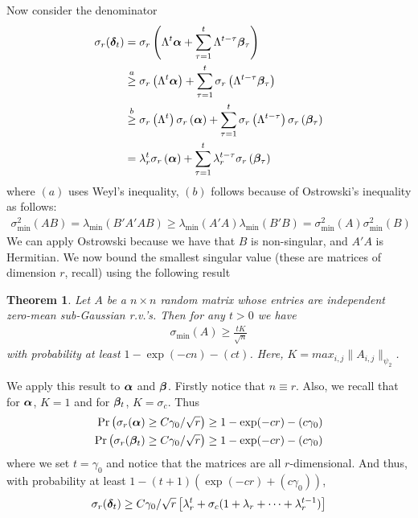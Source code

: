 \documentclass[10pt]{article}
\newtheorem{theorem}{Theorem}
\begin{document}
Now consider the denominator
\begin{align*}
\sigma_r(\bm{\delta}_t) &= \sigma_r\left(\Lambda^t \bm{\alpha} + \sum_{\tau=1}^t \Lambda^{t-\tau} \bm{\beta}_\tau\right) \\
&\overset{a}{\geq}  \sigma_r\left(\Lambda^t \bm{\alpha}\right) + \sum_{\tau=1}^t \sigma_r\left(\Lambda^{t-\tau} \bm{\beta}_\tau\right) \\
&\overset{b}{\geq}  \sigma_r\left(\Lambda^t \right) \sigma_r \left( \bm{\alpha}\right) + \sum_{\tau=1}^t \sigma_r\left(\Lambda^{t-\tau}\right) \sigma_r\left(\bm{\beta}_\tau\right) \\
&= \lambda_r^t \sigma_r\left( \bm{\alpha}\right) + \sum_{\tau=1}^t \lambda_{r}^{t-\tau} \sigma_r\left(\bm{\beta}_\tau\right) 
\end{align*}
where $(a)$ uses Weyl's inequality, $(b)$ follows because of Ostrowski's inequality as follows: 
\begin{align*}
\sigma_{\min}^2(AB) = \lambda_{\min}(B'A'A B) \geq \lambda_{\min}(A'A) \lambda_{\min}(B'B) = \sigma_{\min}^2(A) \sigma_{\min}^2(B)
\end{align*}
We can apply Ostrowski because we have that $B$ is non-singular, and $A'A$ is Hermitian. We now bound the smallest singular value (these are matrices of dimension $r$, recall) using the following result \cite[Theorem 1.2]{smallest}
\begin{theorem}
Let $A$ be a $n \times n$ random matrix whose entries are independent zero-mean sub-Gaussian r.v.'s. Then for any $t >0$ we have 
\begin{align*}
\sigma_{\min}(A) \geq \frac{t K}{\sqrt n}
\end{align*}
with probability at least $1 -  \exp(-c n) - (ct)$. Here, $K = max_{i,j} \|A_{i,j}\|_{\psi_2}$. 
\end{theorem}
We apply this result to $\bm{\alpha}$ and $\bm{\beta}$. Firstly notice that $n \equiv r$. Also, we recall that for $\bm{\alpha}$, $K = 1$ and for $\bm{\beta}_t$, $K = \sigma_c$. Thus
\begin{align*}
\Pr\left(\sigma_{r}(\bm{\alpha}) \geq C \gamma_0/\sqrt{r}\right) \geq  1 - \exp(-cr) - (c \gamma_0) \\
\Pr\left(\sigma_{r}(\bm{\beta}_t) \geq C \gamma_0/\sqrt{r}\right) \geq  1 - \exp(-cr) - (c \gamma_0)
\end{align*}
where we set $t = \gamma_0$ and notice that the matrices are all $r$-dimensional. And thus, with probability at least $1 - (t+1) (\exp(-cr) + (c\gamma_0))$, 
\begin{align*}
\sigma_r(\bm{\delta}_t) \geq C \gamma_0/\sqrt{r} \left[ \lambda_r^t + \sigma_c (1 + \lambda_r + \cdots + \lambda_r^{t-1})\right]
\end{align*}
\end{document}
